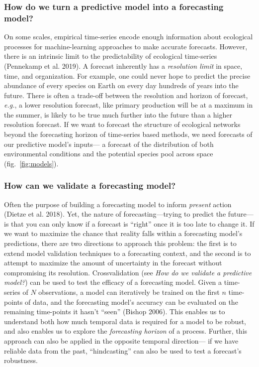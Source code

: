 \documentclass[10pt,oneside]{article}
\begin{document}
\hypertarget{how-do-we-turn-a-predictive-model-into-a-forecasting-model}{%
\subsubsection{How do we turn a predictive model into a forecasting
model?}\label{how-do-we-turn-a-predictive-model-into-a-forecasting-model}}

On some scales, empirical time-series encode enough information about
ecological processes for machine-learning approaches to make accurate
forecasts. However, there is an intrinsic limit to the predictability of
ecological time-series (Pennekamp et al. 2019). A forecast inherently
has a \emph{resolution limit} in space, time, and organization. For
example, one could never hope to predict the precise abundance of every
species on Earth on every day hundreds of years into the future. There
is often a trade-off between the resolution and horizon of forecast,
\emph{e.g.}, a lower resolution forecast, like primary production will
be at a maximum in the summer, is likely to be true much further into
the future than a higher resolution forecast. If we want to forecast the
structure of ecological networks beyond the forecasting horizon of
time-series based methods, we need forecasts of our predictive model's
inputs--- a forecast of the distribution of both environmental
conditions and the potential species pool across space
(fig.~\ref{fig:models}).

\hypertarget{how-can-we-validate-a-forecasting-model}{%
\subsubsection{How can we validate a forecasting
model?}\label{how-can-we-validate-a-forecasting-model}}

Often the purpose of building a forecasting model to inform
\emph{present} action (Dietze et al. 2018). Yet, the nature of
forecasting---trying to predict the future---is that you can only know
if a forecast is ``right'' once it is too late to change it. If we want
to maximize the chance that reality falls within a forecasting model's
predictions, there are two directions to approach this problem: the
first is to extend model validation techniques to a forecasting context,
and the second is to attempt to maximize the amount of uncertainty in
the forecast without compromising its resolution. Crossvalidation (see
\emph{How do we validate a predictive model?}) can be used to test the
efficacy of a forecasting model. Given a time-series of \(N\)
observations, a model can iteratively be trained on the first \(n\)
time-points of data, and the forecasting model's accuracy can be
evaluated on the remaining time-points it hasn't ``seen'' (Bishop 2006).
This enables us to understand both how much temporal data is required
for a model to be robust, and also enables us to explore the
\emph{forecasting horizon} of a process. Further, this approach can also
be applied in the opposite temporal direction--- if we have reliable
data from the past, ``hindcasting'' can also be used to test a
forecast's robustness.
\end{document}
